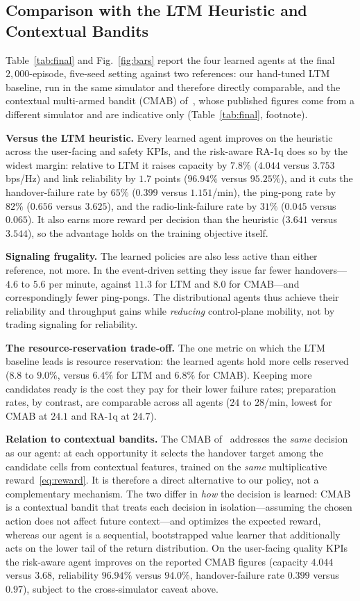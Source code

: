 \documentclass[conference]{IEEEtran}
\begin{document}
\subsection{Comparison with the LTM Heuristic and Contextual Bandits}
\label{sec:results-main}
Table~\ref{tab:final} and Fig.~\ref{fig:bars} report the four learned agents at the final
$2{,}000$-episode, five-seed setting against two references: our hand-tuned LTM
baseline, run in the same simulator and therefore directly comparable, and the
contextual multi-armed bandit (CMAB) of~\cite{cmab_ho}, whose published figures
come from a different simulator and are indicative only (Table~\ref{tab:final},
footnote).

\textbf{Versus the LTM heuristic.} Every learned agent improves on the heuristic
across the user-facing and safety KPIs, and the risk-aware RA-1q does so by the
widest margin: relative to LTM it raises capacity by $7.8\%$ ($4.044$ versus
$3.753$\,bps/Hz) and link reliability by $1.7$ points ($96.94\%$ versus
$95.25\%$), and it cuts the handover-failure rate by $65\%$ ($0.399$ versus
$1.151$/min), the ping-pong rate by $82\%$ ($0.656$ versus $3.625$), and the
radio-link-failure rate by $31\%$ ($0.045$ versus $0.065$).
It also earns more reward per decision than the heuristic ($3.641$ versus
$3.544$), so the advantage holds on the training objective itself.

\textbf{Signaling frugality.} The learned policies are also less active than either
reference, not more. In the event-driven setting they issue far fewer
handovers---$4.6$ to $5.6$ per minute, against $11.3$ for LTM and $8.0$ for
CMAB---and correspondingly fewer ping-pongs. The distributional agents thus achieve
their reliability and throughput gains while \emph{reducing} control-plane
mobility, not by trading signaling for reliability.

\textbf{The resource-reservation trade-off.} The one metric on which the
LTM baseline leads is resource reservation: the learned agents hold more cells
reserved ($8.8$ to $9.0\%$, versus $6.4\%$ for LTM and $6.8\%$ for CMAB). Keeping
more candidates ready is the cost they pay for their lower failure rates;
preparation rates, by contrast, are comparable across all agents ($24$ to
$28$/min, lowest for CMAB at $24.1$ and RA-1q at $24.7$).

\textbf{Relation to contextual bandits.} The CMAB of~\cite{cmab_ho} addresses
the \emph{same} decision as our agent: at each opportunity it selects the handover
target among the candidate cells from contextual features, trained on the
\emph{same} multiplicative reward~\eqref{eq:reward}. It is therefore a direct
alternative to our policy, not a complementary mechanism. The two differ in
\emph{how} the decision is learned: CMAB is a contextual bandit that treats each
decision in isolation---assuming the chosen action does not affect future
context---and optimizes the expected reward, whereas our agent is a sequential,
bootstrapped value learner that additionally acts on the lower tail of the return
distribution. On the user-facing quality KPIs the risk-aware agent improves on the
reported CMAB figures (capacity $4.044$ versus $3.68$, reliability $96.94\%$ versus
$94.0\%$, handover-failure rate $0.399$ versus $0.97$), subject to the
cross-simulator caveat above.
\end{document}
